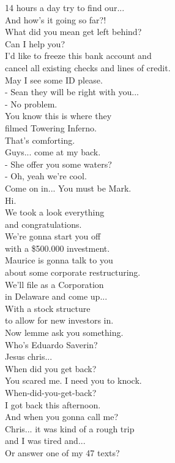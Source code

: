\documentclass{article}
\begin{document}
\begin{multicols}{3}
 14 hours a day try to find our...\\
And how's it going so far?!\\
What did you mean get left behind?\\
Can I help you?\\
I'd like to freeze this bank account and\\
cancel all existing checks and lines of credit.\\
May I see some ID please.\\
- Sean they will be right with you...\\
- No problem.\\
You know this is where they\\
filmed Towering Inferno.\\
That's comforting.\\
Guys... come at my back.\\
- She offer you some waters?\\
- Oh, yeah we're cool.\\
Come on in... You must be Mark.\\
Hi.\\
We took a look everything\\
and congratulations.\\
We're gonna start you off\\
with a \$500.000 investment.\\
Maurice is gonna talk to you\\
about some corporate restructuring.\\
We'll file as a Corporation\\
in Delaware and come up...\\
With a stock structure\\
to allow for new investors in.\\
Now lemme ask you something.\\
Who's Eduardo Saverin?\\
Jesus chris...\\
When did you get back?\\
You scared me. I need you to knock.\\
When-did-you-get-back?\\
I got back this afternoon.\\
And when you gonna call me?\\
Chris... it was kind of a rough trip\\
and I was tired and...\\
Or answer one of my 47 texts?\\

\end{multicols}
\end{document}
